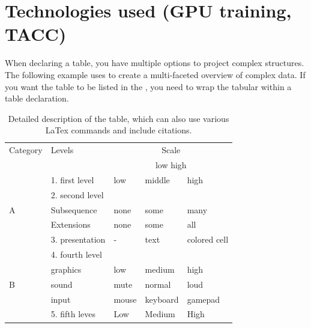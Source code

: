 \newpage
\section{Technologies used (GPU training, TACC)}

When declaring a table, you have multiple options to project complex structures. The following example uses  to create a multi-faceted overview of complex data. If you want the table to be listed in the , you need to wrap the tabular within a table declaration.

\begin{table}[H]
\begin{tabular}{| l | l | l | l | l |}
\hline
 Category & Levels & \multicolumn{3}{c|}{Scale} \\
&&\multicolumn{3}{c|}{low \hspace*{\fill} high}\\
\hline
 \multirow{5}{*}{A} & 1. first level & low & middle & high \\ \cline{2-5}
 & 2. second level & & & \\ 
 & Subsequence & none & some &many \\
 & Extensions & none & some & all\\ \cline{2-5}
 & 3. presentation & - & text & \cellcolor{green}colored cell \\
\hline
 \multirow{5}{*}{B} & 4. fourth level &  &  &  \\ \cline{2-5}
 & graphics & low & medium & high\\ 
 & sound & mute & normal & loud \\
 & input & mouse & keyboard & gamepad\\ \cline{2-5}
 & 5. fifth leves & Low & Medium & High \\
\hline
\end{tabular}
\caption[Table description for list of tables.]{Detailed description of the table, which can also use various LaTex commands and include citations.}
\end{table}






